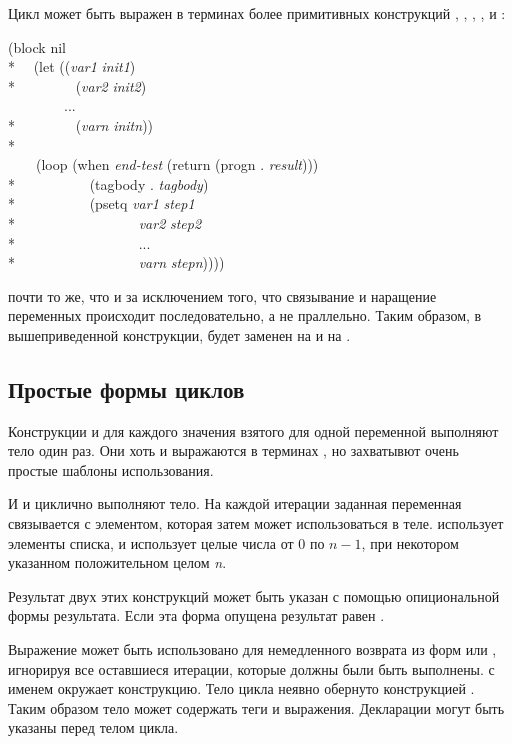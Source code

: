 \begin{defmac}
Цикл  может быть выражен в терминах более примитивных конструкций 
, , , , 
и :
\begin{lisp}
(block nil \\*
~~(let ((\emph{var1} \emph{init1}) \\*
~~~~~~~~(\emph{var2} \emph{init2}) \\
~~~~~~~~... \\*
~~~~~~~~(\emph{varn} \emph{initn})) \\*
~~~~ \\
~~~~(loop (when \emph{end-test} (return (progn . \emph{result}))) \\*
~~~~~~~~~~(tagbody . \emph{tagbody}) \\*
~~~~~~~~~~(psetq \emph{var1} \emph{step1} \\*
~~~~~~~~~~~~~~~~~\emph{var2} \emph{step2} \\*
~~~~~~~~~~~~~~~~~... \\*
~~~~~~~~~~~~~~~~~\emph{varn} \emph{stepn}))))
\end{lisp}
 почти то же, что и  за исключением того, что связывание и
наращение переменных происходит последовательно, а не праллельно.
Таким образом, в вышеприведенной конструкции,  будет заменен на
 и  на .
\end{defmac}

\subsection{Простые формы циклов}

Конструкции  и  для каждого значения взятого для одной
переменной выполняют тело один раз. Они хоть и выражаются в терминах ,
но захватывют очень простые шаблоны использования.

И  и  циклично выполняют тело. На каждой итерации
заданная переменная связывается с элементом, которая затем может использоваться
в теле.  использует элементы списка, и  использует
целые числа от 0 по $n-1$, при некотором указанном положительном целом \emph{n}.

Результат двух этих конструкций может быть указан с помощью опициональной формы
результата. Если эта форма опущена результат равен {\false}.

Выражение  может быть использовано для немедленного возврата из форм
 или , игнорируя все оставшиеся итерации, которые
должны были быть выполнены.  с именем {\nil} окружает конструкцию.
Тело цикла неявно обернуто конструкцией .
Таким образом тело может содержать теги и  выражения.
Декларации могут быть указаны перед телом цикла.

